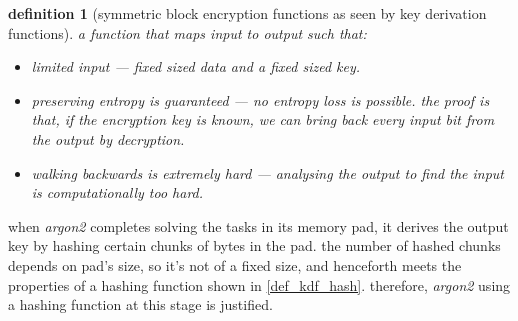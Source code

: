 \documentclass[twocolumn]{article}
\newtheorem{definition}{definition}[section]
\begin{document}
\begin{definition}[symmetric block encryption functions as seen by key
derivation functions]\label{def_kdf_enc}
    a function that maps input to output such that:
    \begin{itemize}
        \item limited input --- fixed sized data and a fixed sized
        key.
        \item preserving entropy is guaranteed --- no entropy loss is
        possible.  the proof is that, if the encryption key is known, we
        can bring back every input bit from the output by decryption.
        \item walking backwards is extremely hard --- analysing the output
        to find the input is computationally too hard.
    \end{itemize}
\end{definition}

when \emph{argon2} completes solving the tasks in its memory pad, it
derives the output key by hashing certain chunks of bytes in the pad.  the
number of hashed chunks depends on pad's size, so it's not of a fixed size,
and henceforth meets the properties of a hashing function shown in
\cref{def_kdf_hash}.  therefore, \emph{argon2} using a hashing function at
this stage is justified.
\end{document}
